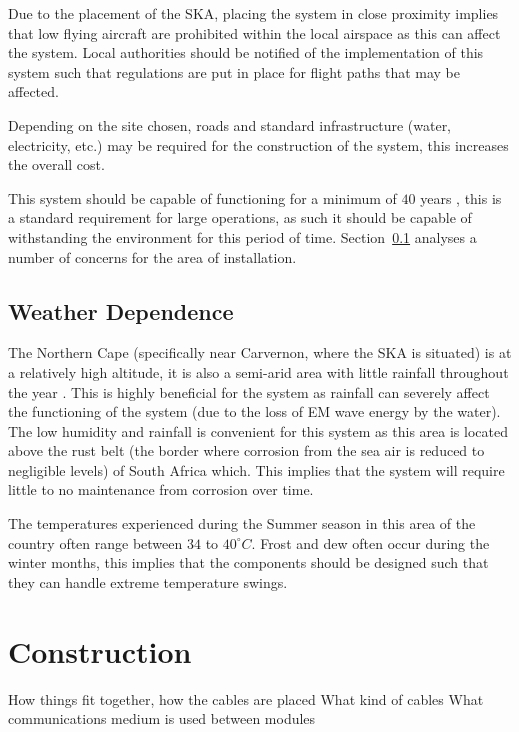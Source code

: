 \documentclass[11pt]{witseiepaper}
\begin{document}
Due to the placement of the SKA, placing the system in close proximity implies that low flying aircraft are prohibited within the local airspace as this can affect the system.
Local authorities should be notified of the implementation of this system such that regulations are put in place for flight paths that may be affected.

Depending on the site chosen, roads and standard infrastructure (water, electricity, etc.) may be required for the construction of the system, this increases the overall cost.

This system should be capable of functioning for a minimum of $40$ years \cite[p.~336]{AMISRCosting}, this is a standard requirement for large operations, as such it should be capable of withstanding the environment for this period of time. Section~\ref{sec:WeatherDependence} analyses a number of concerns for the area of installation.

\subsection{Weather Dependence} \label{sec:WeatherDependence}
The Northern Cape (specifically near Carvernon, where the SKA is situated) is at a relatively high altitude, it is also a semi-arid area with little rainfall throughout the year \cite{Rainfall}.
This is highly beneficial for the system as rainfall can severely affect the functioning of the system (due to the loss of EM wave energy by the water).
The low humidity and rainfall is convenient for this system as this area is located above the rust belt (the border where corrosion from the sea air is reduced to negligible levels) of South Africa which. This implies that the system will require little to no maintenance from corrosion over time.

The temperatures experienced during the Summer season in this area of the country often range between $34$ to $40^{\circ} C$. Frost and dew often occur during the winter months, this implies that the components should be designed such that they can handle extreme temperature swings.

\section{Construction} \label{sec:Construction}

How things fit together, how the cables are placed
What kind of cables
What communications medium is used between modules
\end{document}
